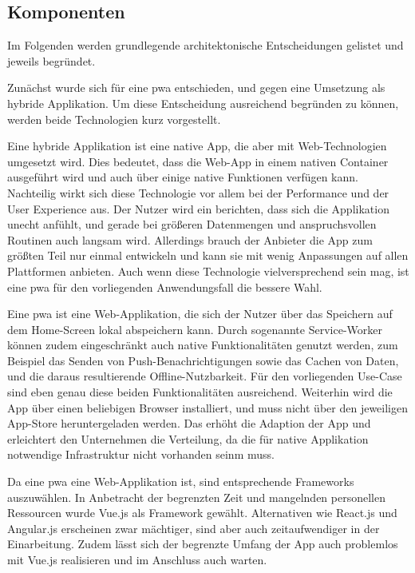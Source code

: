 \subsection{Komponenten}

Im Folgenden werden grundlegende architektonische Entscheidungen gelistet und jeweils begründet.

Zunächst wurde sich für eine \gls{pwa} entschieden, und gegen eine Umsetzung als hybride Applikation. Um diese Entscheidung ausreichend begründen zu können, werden beide Technologien kurz vorgestellt.

Eine hybride Applikation ist eine native App, die aber mit Web-Technologien umgesetzt wird. Dies bedeutet, dass die Web-App in einem nativen Container ausgeführt wird und auch über einige native Funktionen verfügen kann. Nachteilig wirkt sich diese Technologie vor allem bei der Performance und der User Experience aus. Der Nutzer wird ein berichten, dass sich die Applikation unecht anfühlt, und gerade bei größeren Datenmengen und anspruchsvollen Routinen auch langsam wird. Allerdings brauch der Anbieter die App zum größten Teil nur einmal entwickeln und kann sie mit wenig Anpassungen auf allen Plattformen anbieten. Auch wenn diese Technologie vielversprechend sein mag, ist eine \gls{pwa} für den vorliegenden Anwendungsfall die bessere Wahl.

Eine \gls{pwa} ist eine Web-Applikation, die sich der Nutzer über das Speichern auf dem Home-Screen lokal abspeichern kann. Durch sogenannte Service-Worker können zudem eingeschränkt auch native Funktionalitäten genutzt werden, zum Beispiel das Senden von Push-Benachrichtigungen sowie das Cachen von Daten, und die daraus resultierende Offline-Nutzbarkeit. Für den vorliegenden Use-Case sind eben genau diese beiden Funktionalitäten ausreichend. Weiterhin wird die App über einen beliebigen Browser installiert, und muss nicht über den jeweiligen App-Store heruntergeladen werden. Das erhöht die Adaption der App und erleichtert den Unternehmen die Verteilung, da die für native Applikation notwendige Infrastruktur nicht vorhanden seinm muss.

Da eine \gls{pwa} eine Web-Applikation ist, sind entsprechende Frameworks auszuwählen. In Anbetracht der begrenzten Zeit und mangelnden personellen Ressourcen wurde Vue.js als Framework gewählt. Alternativen wie React.js und Angular.js erscheinen zwar mächtiger, sind aber auch zeitaufwendiger in der Einarbeitung. Zudem lässt sich der begrenzte Umfang der App auch problemlos mit Vue.js realisieren und im Anschluss auch warten.

